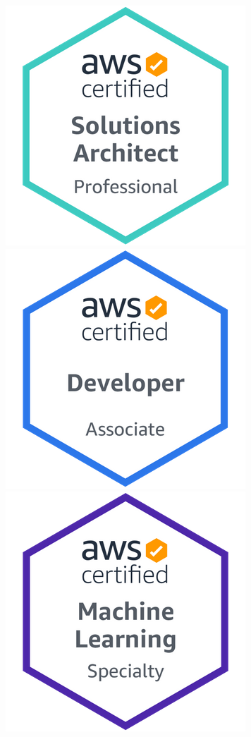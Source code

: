 \documentclass{article}
\begin{document}
\begin{table}[hbt!]
\centering
\vspace{0.8em}
\includegraphics[scale=0.2]{AWS-SolArchitect-Professional-2020.png}
\includegraphics[scale=0.2]{AWS-Developer-Associate-2020.png}
\includegraphics[scale=0.2]{AWS-MachineLearning-Specialty-2020.png}

\end{table}
\end{document}
